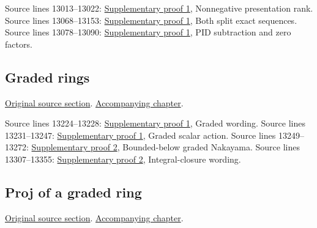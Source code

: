 \begin{AlgebraSourceRoutes}
 Source lines 13013--13022: \hyperlink{algebra_localization_kgroups_graded_notes_20260927}{Supplementary proof 1}, Nonnegative presentation rank.
 Source lines 13068--13153: \hyperlink{algebra_localization_kgroups_graded_notes_20260927}{Supplementary proof 1}, Both split exact sequences.
 Source lines 13078--13090: \hyperlink{algebra_localization_kgroups_graded_notes_20260927}{Supplementary proof 1}, PID subtraction and zero factors.
\end{AlgebraSourceRoutes}

\subsection{Graded rings}
\hypertarget{algebra-source-section-graded}{}
\noindent\href{https://github.com/stacks/stacks-project/blob/a04446e57ec1fbc252a871afcec7752fb2807b14/algebra.tex\#L13199}{Original source section}. \href{algebra.pdf\#nameddest=section-graded}{Accompanying chapter}.

\begin{AlgebraSourceRoutes}
 Source lines 13224--13228: \hyperlink{algebra_localization_kgroups_graded_notes_20260927}{Supplementary proof 1}, Graded wording.
 Source lines 13231--13247: \hyperlink{algebra_localization_kgroups_graded_notes_20260927}{Supplementary proof 1}, Graded scalar action.
 Source lines 13249--13272: \hyperlink{algebra_graded_proj_hilbert_notes_20260927}{Supplementary proof 2}, Bounded-below graded Nakayama.
 Source lines 13307--13355: \hyperlink{algebra_graded_proj_hilbert_notes_20260927}{Supplementary proof 2}, Integral-closure wording.
\end{AlgebraSourceRoutes}

\subsection{Proj of a graded ring}
\hypertarget{algebra-source-section-proj}{}
\noindent\href{https://github.com/stacks/stacks-project/blob/a04446e57ec1fbc252a871afcec7752fb2807b14/algebra.tex\#L13364}{Original source section}. \href{algebra.pdf\#nameddest=section-proj}{Accompanying chapter}.

